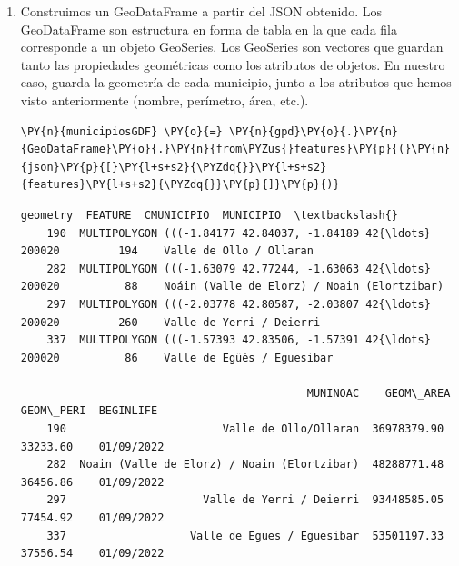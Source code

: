\begin{itemize}
\begin{enumerate}
        \item Construimos un GeoDataFrame a partir del JSON obtenido. Los GeoDataFrame son estructura en forma de tabla en la que cada fila corresponde a un objeto GeoSeries.
        Los GeoSeries son vectores que guardan tanto las propiedades geométricas como los atributos de objetos. En nuestro caso, guarda la geometría de cada municipio, 
        junto a los atributos que hemos visto anteriormente (nombre, perímetro, área, etc.).
\begin{tcolorbox}[breakable, size=fbox, boxrule=1pt, colback=cellbackground, colframe=cellborder, fontupper=\footnotesize]
    \begin{Verbatim}[commandchars=\\\{\}]
    \PY{n}{municipiosGDF} \PY{o}{=} \PY{n}{gpd}\PY{o}{.}\PY{n}{GeoDataFrame}\PY{o}{.}\PY{n}{from\PYZus{}features}\PY{p}{(}\PY{n}{json}\PY{p}{[}\PY{l+s+s2}{\PYZdq{}}\PY{l+s+s2}{features}\PY{l+s+s2}{\PYZdq{}}\PY{p}{]}\PY{p}{)}
    \end{Verbatim}
\end{tcolorbox}
\begin{tcolorbox}[breakable, size=fbox, boxrule=.5pt, pad at break*=1mm, opacityfill=0, fontupper=\tiny]
    \begin{Verbatim}[commandchars=\\\{\}]
                                                    geometry  FEATURE  CMUNICIPIO  MUNICIPIO  \textbackslash{}
    190  MULTIPOLYGON (((-1.84177 42.84037, -1.84189 42{\ldots}   200020         194    Valle de Ollo / Ollaran
    282  MULTIPOLYGON (((-1.63079 42.77244, -1.63063 42{\ldots}   200020          88    Noáin (Valle de Elorz) / Noain (Elortzibar)
    297  MULTIPOLYGON (((-2.03778 42.80587, -2.03807 42{\ldots}   200020         260    Valle de Yerri / Deierri
    337  MULTIPOLYGON (((-1.57393 42.83506, -1.57391 42{\ldots}   200020          86    Valle de Egüés / Eguesibar                
    
                                            MUNINOAC    GEOM\_AREA  GEOM\_PERI  BEGINLIFE
    190                        Valle de Ollo/Ollaran  36978379.90   33233.60    01/09/2022
    282  Noain (Valle de Elorz) / Noain (Elortzibar)  48288771.48   36456.86    01/09/2022
    297                     Valle de Yerri / Deierri  93448585.05   77454.92    01/09/2022
    337                   Valle de Egues / Eguesibar  53501197.33   37556.54    01/09/2022
    \end{Verbatim}
\end{tcolorbox}


\end{enumerate}
\end{itemize}
